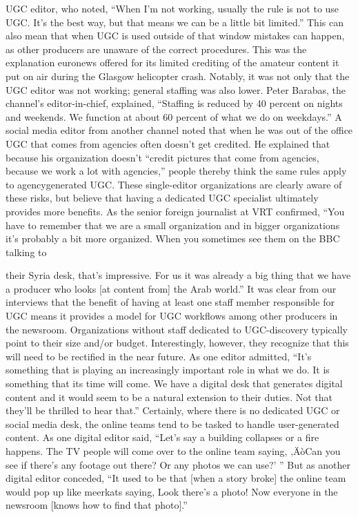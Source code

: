 \documentclass[symmetric, notoc, nobib]{towcenter-book}
\begin{document}
UGC editor, who noted, ``When I'm not working, usually the rule is not to
use UGC. It's the best way, but that means we can be a little bit limited.''
This can also mean that when UGC is used outside of that window mistakes
can happen, as other producers are unaware of the correct procedures. This
was the explanation euronews offered for its limited crediting of the amateur
content it put on air during the Glasgow helicopter crash. Notably, it
was not only that the UGC editor was not working; general staffing was
also lower. Peter Barabas, the channel's editor-in-chief, explained, ``Staffing
is reduced by 40 percent on nights and weekends. We function at about 60
percent of what we do on weekdays.'' A social media editor from another
channel noted that when he was out of the office UGC that comes from
agencies often doesn't get credited. He explained that because his organization
doesn't ``credit pictures that come from agencies, because we work
a lot with agencies,'' people thereby think the same rules apply to agencygenerated
UGC.
These single-editor organizations are clearly aware of these risks, but believe
that having a dedicated UGC specialist ultimately provides more benefits.
As the senior foreign journalist at VRT confirmed, ``You have to remember
that we are a small organization and in bigger organizations it's probably a
bit more organized. When you sometimes see them on the BBC talking to

their Syria desk, that's impressive. For us it was already a big thing that we
have a producer who looks [at content from] the Arab world.'' It was clear
from our interviews that the benefit of having at least one staff member
responsible for UGC means it provides a model for UGC workflows among
other producers in the newsroom.
Organizations without staff dedicated to UGC-discovery typically point to
their size and/or budget. Interestingly, however, they recognize that this
will need to be rectified in the near future. As one editor admitted, ``It's
something that is playing an increasingly important role in what we do. It
is something that its time will come. We have a digital desk that generates
digital content and it would seem to be a natural extension to their duties.
Not that they'll be thrilled to hear that.''
Certainly, where there is no dedicated UGC or social media desk, the online
teams tend to be tasked to handle user-generated content. As one digital
editor said, ``Let's say a building collapses or a fire happens. The TV people
will come over to the online team saying, ‚ÄòCan you see if there's any footage
out there? Or any photos we can use?' '' But as another digital editor conceded,
``It used to be that [when a story broke] the online team would pop
up like meerkats saying, Look there's a photo! Now everyone in the newsroom
[knows how to find that photo].''
\end{document}
